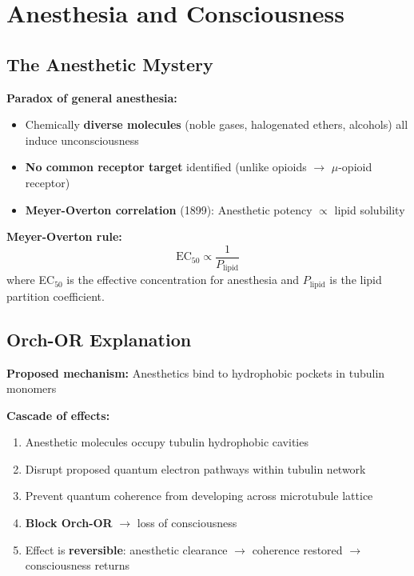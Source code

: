 \section{Anesthesia and Consciousness}

\subsection{The Anesthetic Mystery}

\textbf{Paradox of general anesthesia:}
\begin{itemize}
\item Chemically \textbf{diverse molecules} (noble gases, halogenated ethers, alcohols) all induce unconsciousness
\item \textbf{No common receptor target} identified (unlike opioids $\rightarrow$ $\mu$-opioid receptor)
\item \textbf{Meyer-Overton correlation} (1899): Anesthetic potency $\propto$ lipid solubility
\end{itemize}

\textbf{Meyer-Overton rule:}
\begin{equation}
\label{eq:meyer-overton}
\text{EC}_{50} \propto \frac{1}{P_{\text{lipid}}}
\end{equation}
where EC$_{50}$ is the effective concentration for anesthesia and $P_{\text{lipid}}$ is the lipid partition coefficient.

\subsection{Orch-OR Explanation}

\textbf{Proposed mechanism:} Anesthetics bind to hydrophobic pockets in tubulin monomers

\textbf{Cascade of effects:}
\begin{enumerate}
\item Anesthetic molecules occupy tubulin hydrophobic cavities
\item Disrupt proposed quantum electron pathways within tubulin network
\item Prevent quantum coherence from developing across microtubule lattice
\item \textbf{Block Orch-OR} $\rightarrow$ loss of consciousness
\item Effect is \textbf{reversible}: anesthetic clearance $\rightarrow$ coherence restored $\rightarrow$ consciousness returns
\end{enumerate}

